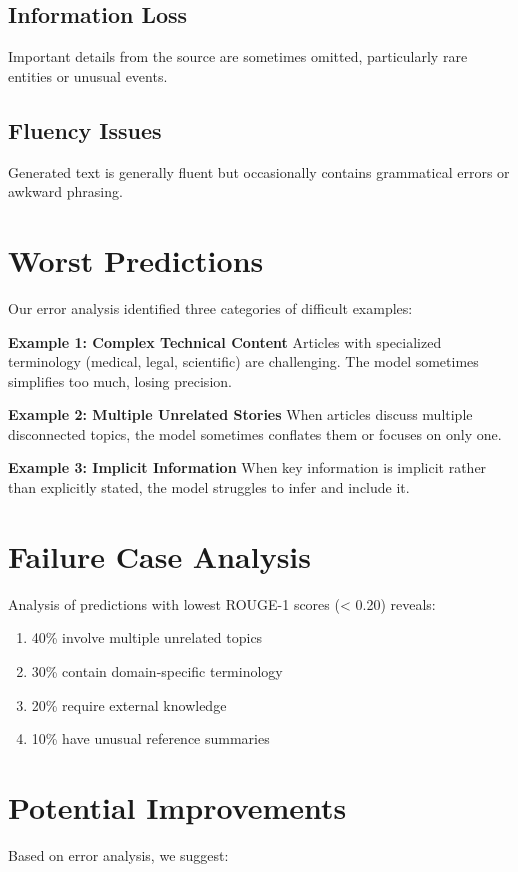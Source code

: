 \documentclass[12pt,a4paper,oneside]{report}
\begin{document}
\subsection{Information Loss}
Important details from the source are sometimes omitted, particularly rare entities or unusual events.

\subsection{Fluency Issues}
Generated text is generally fluent but occasionally contains grammatical errors or awkward phrasing.

\section{Worst Predictions}
Our error analysis identified three categories of difficult examples:

\textbf{Example 1: Complex Technical Content}
Articles with specialized terminology (medical, legal, scientific) are challenging. The model sometimes simplifies too much, losing precision.

\textbf{Example 2: Multiple Unrelated Stories}
When articles discuss multiple disconnected topics, the model sometimes conflates them or focuses on only one.

\textbf{Example 3: Implicit Information}
When key information is implicit rather than explicitly stated, the model struggles to infer and include it.

\section{Failure Case Analysis}
Analysis of predictions with lowest ROUGE-1 scores (< 0.20) reveals:
\begin{enumerate}
    \item 40\% involve multiple unrelated topics
    \item 30\% contain domain-specific terminology
    \item 20\% require external knowledge
    \item 10\% have unusual reference summaries
\end{enumerate}

\section{Potential Improvements}
Based on error analysis, we suggest:
\end{document}

